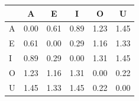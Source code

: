 \begin{tabular}{lccccc}
\toprule
\rowcolor{col01}
 & A & E & I & O & U \\
\midrule
A & 0.00 & 0.61 & 0.89 & 1.23 & 1.45 \\
E & 0.61 & 0.00 & 0.29 & 1.16 & 1.33 \\
I & 0.89 & 0.29 & 0.00 & 1.31 & 1.45 \\
O & 1.23 & 1.16 & 1.31 & 0.00 & 0.22 \\
U & 1.45 & 1.33 & 1.45 & 0.22 & 0.00 \\
\bottomrule
\end{tabular}
